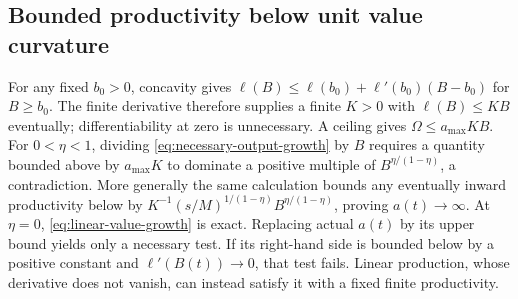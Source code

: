 \subsection{Bounded productivity below unit value curvature}
\label{app:ceiling-growth-proof}
For any fixed $b_0>0$, concavity gives
$\ell(B)\leq\ell(b_0)+\ell'(b_0)(B-b_0)$ for $B\geq b_0$.
The finite derivative therefore supplies a finite $K>0$ with
$\ell(B)\leq KB$ eventually; differentiability at zero is unnecessary.
A ceiling gives $\Omega\leq a_{\max}KB$. For $0<\eta<1$, dividing
\cref{eq:necessary-output-growth} by $B$ requires a quantity bounded
above by $a_{\max}K$ to dominate a positive multiple of
$B^{\eta/(1-\eta)}$, a contradiction. More generally the same calculation
bounds any eventually inward productivity below by
$K^{-1}(s/M)^{1/(1-\eta)}B^{\eta/(1-\eta)}$, proving $a(t)\to\infty$.
At $\eta=0$, \cref{eq:linear-value-growth} is exact. Replacing actual
$a(t)$ by its upper bound yields only a necessary test. If its right-hand
side is bounded below by a positive constant and $\ell'(B(t))\to0$,
that test fails. Linear production, whose derivative does not vanish,
can instead satisfy it with a fixed finite productivity.

